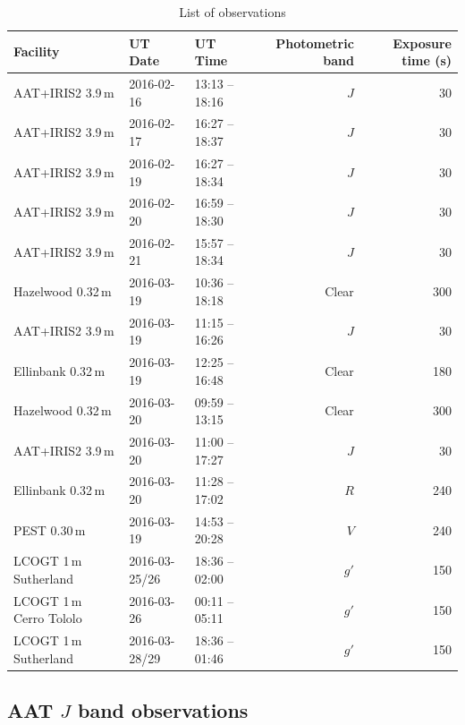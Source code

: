 \documentclass[useAMS,usenatbib]{mn2e}
\begin{document}
\begin{table}
\centering
\caption{\label{tab:observations}List of observations}
\begin{tabular}{lllrr}
\hline\hline
Facility & UT Date & UT Time & Photometric band & Exposure time (s) \\
\hline
AAT+IRIS2 3.9\,m & 2016-02-16 & 13:13 -- 18:16 & $J$ & 30 \\
AAT+IRIS2 3.9\,m & 2016-02-17 & 16:27 -- 18:37 & $J$ & 30 \\
AAT+IRIS2 3.9\,m & 2016-02-19 & 16:27 -- 18:34 & $J$ & 30 \\
AAT+IRIS2 3.9\,m & 2016-02-20 & 16:59 -- 18:30 & $J$ & 30 \\
AAT+IRIS2 3.9\,m & 2016-02-21 & 15:57 -- 18:34 & $J$ & 30 \\
Hazelwood 0.32\,m & 2016-03-19 & 10:36 -- 18:18 & Clear & 300 \\
AAT+IRIS2 3.9\,m & 2016-03-19 & 11:15 -- 16:26 & $J$ & 30 \\
Ellinbank 0.32\,m & 2016-03-19 & 12:25 -- 16:48 & Clear & 180 \\
Hazelwood 0.32\,m & 2016-03-20 & 09:59 -- 13:15 & Clear & 300 \\
AAT+IRIS2 3.9\,m & 2016-03-20 & 11:00 -- 17:27 & $J$ & 30 \\
Ellinbank 0.32\,m & 2016-03-20 & 11:28 -- 17:02 & $R$ & 240 \\
PEST 0.30\,m & 2016-03-19 & 14:53 -- 20:28 & $V$ & 240 \\
LCOGT 1\,m Sutherland & 2016-03-25/26 & 18:36 -- 02:00 & $g'$ & 150 \\
LCOGT 1\,m Cerro Tololo & 2016-03-26 & 00:11 -- 05:11 & $g'$ & 150 \\
LCOGT 1\,m Sutherland & 2016-03-28/29 & 18:36 -- 01:46 & $g'$ & 150 \\
\hline
\end{tabular}
\end{table}

\subsection{AAT $J$ band observations}
\label{sec:obs_aat}
\end{document}
